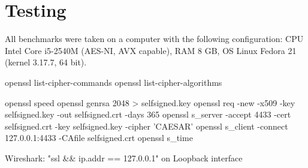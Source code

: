\section{Testing}


All benchmarks were taken on a computer with the following configuration: CPU Intel Core i5-2540M (AES-NI, AVX capable), RAM 8 GB, OS Linux Fedora 21 (kernel 3.17.7, 64 bit).

openssl list-cipher-commands
openssl list-cipher-algorithms

openssl speed
openssl genrsa 2048 > selfsigned.key
openssl req -new -x509 -key selfsigned.key -out selfsigned.crt -days 365
openssl s\_server -accept 4433 -cert selfsigned.crt -key selfsigned.key -cipher 'CAESAR'
openssl s\_client -connect 127.0.0.1:4433 -CAfile selfsigned.crt
openssl s\_time

Wireshark: "ssl \&\& ip.addr == 127.0.0.1" on Loopback interface
